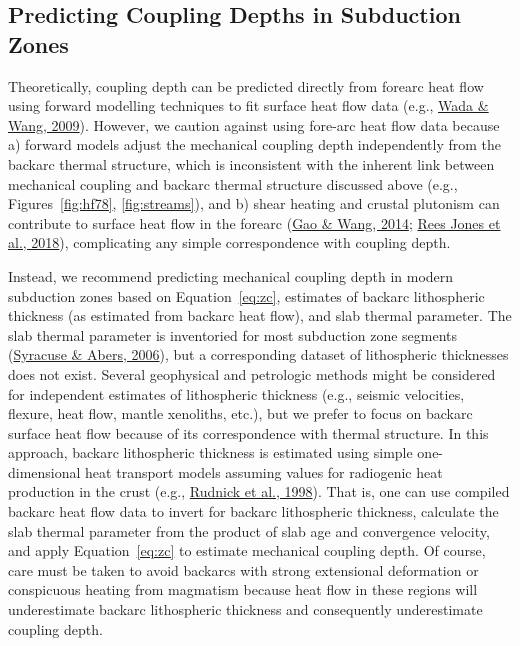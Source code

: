 \documentclass[draft,linenumbers]{agujournal2018}
\begin{document}
\clearpage

\hypertarget{predicting-coupling-depths-in-subduction-zones}{%
\subsection{Predicting Coupling Depths in Subduction
Zones}\label{predicting-coupling-depths-in-subduction-zones}}

Theoretically, coupling depth can be predicted directly from forearc
heat flow using forward modelling techniques to fit surface heat flow
data (e.g., \protect\hyperlink{ref-Wada2009}{Wada \& Wang, 2009}).
However, we caution against using fore-arc heat flow data because a)
forward models adjust the mechanical coupling depth independently from
the backarc thermal structure, which is inconsistent with the inherent
link between mechanical coupling and backarc thermal structure discussed
above (e.g., Figures~\ref{fig:hf78}, \ref{fig:streams}), and b) shear
heating and crustal plutonism can contribute to surface heat flow in the
forearc (\protect\hyperlink{ref-Gao2014}{Gao \& Wang, 2014};
\protect\hyperlink{ref-ReesJones2018}{Rees Jones et al., 2018}),
complicating any simple correspondence with coupling depth.

Instead, we recommend predicting mechanical coupling depth in modern
subduction zones based on Equation~\ref{eq:zc}, estimates of backarc
lithospheric thickness (as estimated from backarc heat flow), and slab
thermal parameter. The slab thermal parameter is inventoried for most
subduction zone segments (\protect\hyperlink{ref-Syracuse2006}{Syracuse
\& Abers, 2006}), but a corresponding dataset of lithospheric
thicknesses does not exist. Several geophysical and petrologic methods
might be considered for independent estimates of lithospheric thickness
(e.g., seismic velocities, flexure, heat flow, mantle xenoliths, etc.),
but we prefer to focus on backarc surface heat flow because of its
correspondence with thermal structure. In this approach, backarc
lithospheric thickness is estimated using simple one-dimensional heat
transport models assuming values for radiogenic heat production in the
crust (e.g., \protect\hyperlink{ref-Rudnick1998}{Rudnick et al., 1998}).
That is, one can use compiled backarc heat flow data to invert for
backarc lithospheric thickness, calculate the slab thermal parameter
from the product of slab age and convergence velocity, and apply
Equation~\ref{eq:zc} to estimate mechanical coupling depth. Of course,
care must be taken to avoid backarcs with strong extensional deformation
or conspicuous heating from magmatism because heat flow in these regions
will underestimate backarc lithospheric thickness and consequently
underestimate coupling depth.
\end{document}
